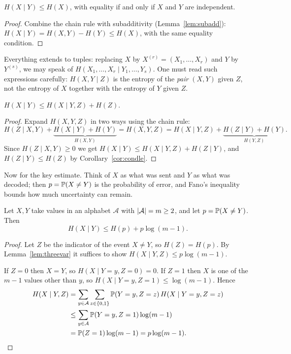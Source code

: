 \documentclass[a4paper]{scrartcl}
\newcommand{\Ac}{\mathcal{A}}
\begin{document}
\begin{corollary}\label{cor:condle}
	$H(X\mid Y)\le H(X)$, with equality if and only if $X$ and $Y$ are independent.
\end{corollary}

\begin{proof}
	Combine the chain rule with subadditivity (Lemma~\ref{lem:subadd}): $H(X\mid Y) = H(X,Y)-H(Y) \le H(X)$, with the same equality condition.
\end{proof}

Everything extends to tuples: replacing $X$ by $X^{(r)} = (X_1,\dots,X_r)$ and $Y$ by $Y^{(s)}$, we may speak of $H(X_1,\dots,X_r\mid Y_1,\dots,Y_s)$. One must read such expressions carefully: $H(X,Y\mid Z)$ is the entropy of the \emph{pair} $(X,Y)$ given $Z$, not the entropy of $X$ together with the entropy of $Y$ given $Z$.

\begin{lemma}\label{lem:threevar}
	$H(X\mid Y) \le H(X\mid Y,Z) + H(Z)$.
\end{lemma}

\begin{proof}
	Expand $H(X,Y,Z)$ in two ways using the chain rule:
	$$H(Z\mid X,Y) + \underbrace{H(X\mid Y)+H(Y)}_{H(X,Y)} = H(X,Y,Z) = H(X\mid Y,Z)+\underbrace{H(Z\mid Y)+H(Y)}_{H(Y,Z)}.$$
	Since $H(Z\mid X,Y)\ge0$ we get $H(X\mid Y) \le H(X\mid Y,Z)+H(Z\mid Y)$, and $H(Z\mid Y)\le H(Z)$ by Corollary~\ref{cor:condle}.
\end{proof}

Now for the key estimate. Think of $X$ as what was sent and $Y$ as what was decoded; then $p = \mathbb{P}(X\ne Y)$ is the probability of error, and Fano's inequality bounds how much uncertainty can remain.

\begin{proposition}\label{prop:fano}
	Let $X,Y$ take values in an alphabet $\Ac$ with $\abs{\Ac} = m \ge 2$, and let $p = \mathbb{P}(X\ne Y)$. Then
	$$H(X\mid Y) \le H(p) + p\log(m-1).$$
\end{proposition}

\begin{proof}
	Let $Z$ be the indicator of the event $X \ne Y$, so $H(Z) = H(p)$. By Lemma~\ref{lem:threevar} it suffices to show $H(X\mid Y,Z)\le p\log(m-1)$.

	If $Z = 0$ then $X = Y$, so $H(X\mid Y=y,Z=0) = 0$. If $Z=1$ then $X$ is one of the $m-1$ values other than $y$, so $H(X\mid Y=y,Z=1)\le\log(m-1)$. Hence
	\begin{align*}
		H(X\mid Y,Z) &= \sum_{y\in\Ac}\sum_{z\in\{0,1\}}\PP(Y=y,Z=z)\,H(X\mid Y=y,Z=z)\\
		&\le \sum_{y\in\Ac}\PP(Y=y,Z=1)\log(m-1)\\
		&= \PP(Z=1)\log(m-1) = p\log(m-1). \qedhere
	\end{align*}
\end{proof}
\end{document}
